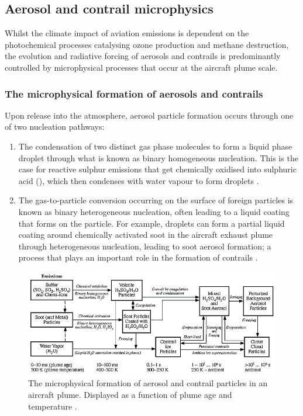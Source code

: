  \subsection{Aerosol and contrail microphysics}
\label{Microphysics}
Whilst the climate impact of aviation  emissions is dependent on the photochemical processes catalysing ozone production and methane destruction, the evolution and radiative forcing of aerosols and contrails is predominantly controlled by microphysical processes that occur at the aircraft plume scale. 

\subsubsection{The microphysical formation of aerosols and contrails}
Upon release into the atmosphere, aerosol particle formation occurs through one of two nucleation pathways: 

\begin{enumerate}
	\item The condensation of two distinct gas phase molecules to form a liquid phase droplet through what is known as binary homogeneous nucleation. This is the case for reactive sulphur emissions that get chemically oxidised into sulphuric acid (), which then condenses with water vapour to form  droplets \cite{Perry1994}.
	\item The gas-to-particle conversion occurring on the surface of foreign particles is known as binary heterogeneous nucleation, often leading to a liquid coating that forms on the particle. For example,  droplets can form a partial liquid coating around chemically activated soot in the aircraft exhaust plume through heterogeneous nucleation, leading to soot aerosol formation; a process that plays an important role in the formation of contrails \cite{Karcher1996a}.
\end{enumerate}

\begin{figure}[H]
  \centering
  \includegraphics[width=0.95\linewidth]{Aerosol_fig.png}
  \caption{The microphysical formation of aerosol and contrail particles in an aircraft plume. Displayed as a function of plume age and temperature \cite{IPCC1999}.}
  \label{Microphys_IPCC}
\end{figure}

